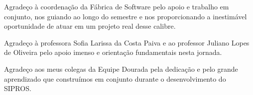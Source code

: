 \begin{agradecimentos}
Agradeço à coordenação da Fábrica de Software pelo apoio e trabalho em conjunto, nos guiando ao longo do semestre e nos proporcionando a inestimável oportunidade de atuar em um projeto real desse calibre.

Agradeço à professora Sofia Larissa da Costa Paiva e ao professor Juliano Lopes de Oliveira pelo apoio imenso e orientação fundamentais nesta jornada.

Agradeço aos meus colegas da Equipe Dourada pela dedicação e pelo grande aprendizado que construímos em conjunto durante o desenvolvimento do SIPROS.
\end{agradecimentos}
